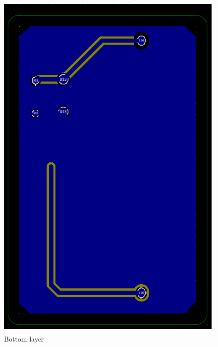 \begin{figure}[!htb]
\begin{minipage}{0.5\textwidth}
    \end{minipage}\hfill
    \begin{minipage}{0.5\textwidth}
    \centering
    \includegraphics[scale = 0.5]{PCB_2.png}
    \caption{Bottom layer}
    \end{minipage}\hfill
    \begin{minipage}{0.5\textwidth}
    \centering

\end{minipage}
\end{figure}
